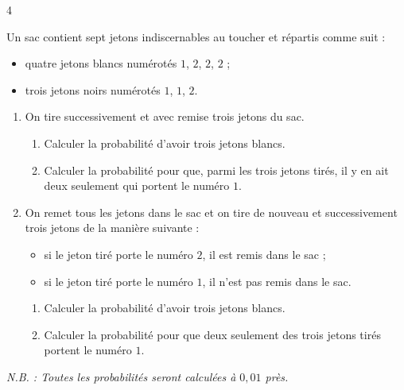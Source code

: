 \documentclass{axiobac}
\begin{document}
\begin{exercice}{4}

Un sac contient sept jetons indiscernables au toucher et répartis comme suit :
\begin{itemize}
    \item quatre jetons blancs numérotés $1$, $2$, $2$, $2$ ;
    \item trois jetons noirs numérotés $1$, $1$, $2$.
\end{itemize}

\begin{enumerate}
    \item On tire successivement et avec remise trois jetons du sac.
    \begin{enumerate}
        \item Calculer la probabilité d'avoir trois jetons blancs.
        \item Calculer la probabilité pour que, parmi les trois jetons tirés, il y en ait deux seulement qui portent le numéro $1$.
    \end{enumerate}
    \item On remet tous les jetons dans le sac et on tire de nouveau et successivement trois jetons de la manière suivante :
    \begin{itemize}
        \item si le jeton tiré porte le numéro $2$, il est remis dans le sac ;
        \item si le jeton tiré porte le numéro $1$, il n'est pas remis dans le sac.
    \end{itemize}
    \begin{enumerate}
        \item Calculer la probabilité d'avoir trois jetons blancs.
        \item Calculer la probabilité pour que deux seulement des trois jetons tirés portent le numéro $1$.
    \end{enumerate}
\end{enumerate}

\textit{N.B. : Toutes les probabilités seront calculées à $0{,}01$ près.}

\end{exercice}
\end{document}
